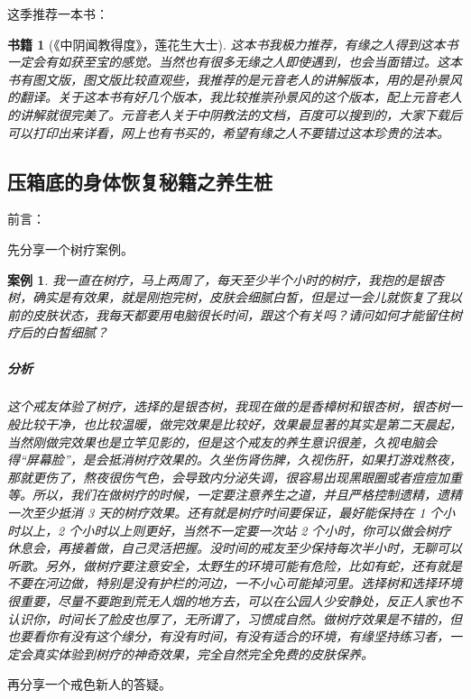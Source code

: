 \documentclass[fontset=founder]{ctexart}
\newtheorem{book}{书籍}
\newtheorem{case}{案例}
\begin{document}
这季推荐一本书：

\begin{book}[《中阴闻教得度》，莲花生大士]
    这本书我极力推荐，有缘之人得到这本书一定会有如获至宝的感觉。当然也有很多无缘之人即使遇到，也会当面错过。这本书有图文版，图文版比较直观些，我推荐的是元音老人的讲解版本，用的是孙景风的翻译。关于这本书有好几个版本，我比较推崇孙景风的这个版本，配上元音老人的讲解就很完美了。元音老人关于中阴教法的文档，百度可以搜到的，大家下载后可以打印出来详看，网上也有书买的，希望有缘之人不要错过这本珍贵的法本。
\end{book}

\subsection{压箱底的身体恢复秘籍之养生桩}

前言：

先分享一个树疗案例。

\begin{case}
    我一直在树疗，马上两周了，每天至少半个小时的树疗，我抱的是银杏树，确实是有效果，就是刚抱完树，皮肤会细腻白皙，但是过一会儿就恢复了我以前的皮肤状态，我每天都要用电脑很长时间，跟这个有关吗？请问如何才能留住树疗后的白皙细腻？
    \subparagraph{分析} 这个戒友体验了树疗，选择的是银杏树，我现在做的是香樟树和银杏树，银杏树一般比较干净，也比较温暖，做完效果是比较好，效果最显著的其实是第二天晨起，当然刚做完效果也是立竿见影的，但是这个戒友的养生意识很差，久视电脑会得“屏幕脸”，是会抵消树疗效果的。久坐伤肾伤脾，久视伤肝，如果打游戏熬夜，那就更伤了，熬夜很伤气色，会导致内分泌失调，很容易出现黑眼圈或者痘痘加重等。所以，我们在做树疗的时候，一定要注意养生之道，并且严格控制遗精，遗精一次至少抵消 3 天的树疗效果。还有就是树疗时间要保证，最好能保持在 1 个小时以上，2 个小时以上则更好，当然不一定要一次站 2 个小时，你可以做会树疗休息会，再接着做，自己灵活把握。没时间的戒友至少保持每次半小时，无聊可以听歌。另外，做树疗要注意安全，太野生的环境可能有危险，比如有蛇，还有就是不要在河边做，特别是没有护栏的河边，一不小心可能掉河里。选择树和选择环境很重要，尽量不要跑到荒无人烟的地方去，可以在公园人少安静处，反正人家也不认识你，时间长了脸皮也厚了，无所谓了，习惯成自然。做树疗效果是不错的，但也要看你有没有这个缘分，有没有时间，有没有适合的环境，有缘坚持练习者，一定会真实体验到树疗的神奇效果，完全自然完全免费的皮肤保养。
\end{case}

再分享一个戒色新人的答疑。
\end{document}
